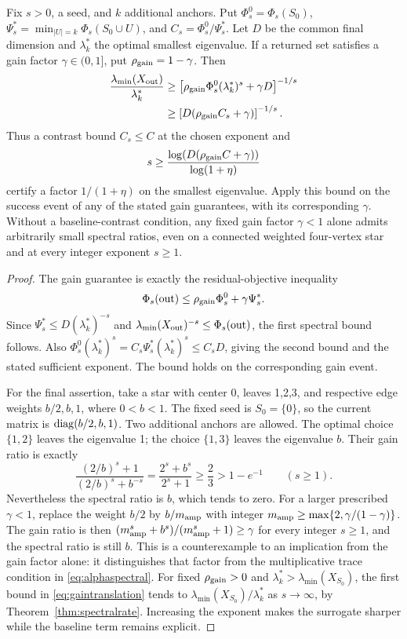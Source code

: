 \begin{theorem}\label{thm:gaintranslation}
Fix $s>0$, a seed, and $k$ additional anchors. Put
$\Phi_s^0=\Phi_s(S_0)$, $\Psi_s^*=\min_{|U|=k}\Phi_s(S_0\cup U)$,
and $C_s=\Phi_s^0/\Psi_s^*$. Let $D$ be the common final dimension
and $\lambda_k^*$ the optimal smallest eigenvalue.
If a returned set satisfies a gain factor $\gamma\in(0,1]$, put
$\rho_{\rm gain}=1-\gamma$. Then
\begin{align}
 \frac{\lambda_{\min}(X_{\rm out})}{\lambda_k^*}
 &\geq\left[\rho_{\rm gain} \Phi_s^0(\lambda_k^*)^s+\gamma D\right]^{-1/s}
 \label{eq:gaintranslation}\\
 &\geq\left[D(\rho_{\rm gain} C_s+\gamma)\right]^{-1/s}.\notag
\end{align}
Thus a contrast bound $C_s\leq C$ at the chosen exponent and
\[
 s\geq\frac{\log(D(\rho_{\rm gain} C+\gamma))}{\log(1+\eta)}
\]
certify a factor $1/(1+\eta)$ on the smallest eigenvalue.
Apply this bound on the success event of any of the stated
gain guarantees, with its corresponding $\gamma$.
Without a baseline-contrast condition, any fixed gain factor
$\gamma<1$ alone admits arbitrarily small spectral ratios, even on
a connected weighted four-vertex star and at every integer exponent
$s\geq1$.
\end{theorem}
\begin{proof}
The gain guarantee is exactly the residual-objective inequality
\[
 \Phi_s({\rm out})\leq\rho_{\rm gain} \Phi_s^0+\gamma\Psi_s^*.
\]
Since $\Psi_s^*\leq D(\lambda_k^*)^{-s}$ and
$\lambda_{\min}(X_{\rm out})^{-s}\leq\Phi_s({\rm out})$,
the first spectral bound follows. Also
$\Phi_s^0(\lambda_k^*)^s=C_s\Psi_s^*(\lambda_k^*)^s\leq C_s D$,
giving the second bound and the stated sufficient exponent.
The bound holds on the corresponding gain event.

For the final assertion, take a star with center 0, leaves 1,2,3,
and respective edge weights $b/2,b,1$, where $0<b<1$. The fixed
seed is $S_0=\{0\}$, so the current matrix is
$\operatorname{diag}(b/2,b,1)$. Two additional anchors are allowed.
The optimal choice $\{1,2\}$ leaves the eigenvalue 1; the choice
$\{1,3\}$ leaves the eigenvalue $b$.
Their gain ratio is exactly
\[
 \frac{(2/b)^s+1}{(2/b)^s+b^{-s}}
 =\frac{2^s+b^s}{2^s+1}\geq\frac23>1-e^{-1}
 \qquad(s\geq1).
\]
Nevertheless the spectral ratio is $b$, which tends to zero.
For a larger prescribed $\gamma<1$, replace the weight $b/2$ by
$b/m_{\rm amp}$ with integer $m_{\rm amp}\geq\max\{2,\gamma/(1-\gamma)\}$.
The gain ratio is then $(m_{\rm amp}^s+b^s)/(m_{\rm amp}^s+1)\geq\gamma$ for
every integer $s\geq1$, and the spectral ratio is still $b$.
This is a counterexample to an implication from the gain factor
alone: it distinguishes that factor from the multiplicative
trace condition in \eqref{eq:alphaspectral}.
For fixed $\rho_{\rm gain}>0$ and $\lambda_k^*>\lambda_{\min}(X_{S_0})$,
the first bound in \eqref{eq:gaintranslation} tends to
$\lambda_{\min}(X_{S_0})/\lambda_k^*$ as $s\to\infty$, by
Theorem~\ref{thm:spectralrate}. Increasing the exponent makes the
surrogate sharper while the baseline term remains explicit.
\end{proof}


